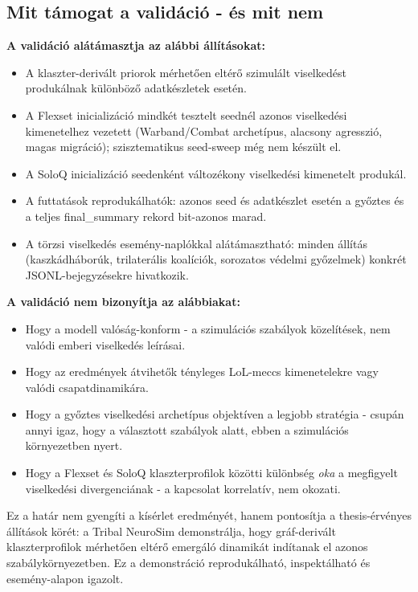 \subsection*{Mit támogat a validáció - és mit nem}

\textbf{A validáció alátámasztja az alábbi állításokat:}

\begin{itemize}
  \item A klaszter-derivált priorok mérhetően eltérő szimulált viselkedést produkálnak különböző adatkészletek esetén.
  \item A Flexset inicializáció mindkét tesztelt seednél azonos viselkedési kimenetelhez vezetett (Warband/Combat archetípus, alacsony agresszió, magas migráció); szisztematikus seed-sweep még nem készült el.
  \item A SoloQ inicializáció seedenként változékony viselkedési kimenetelt produkál.
  \item A futtatások reprodukálhatók: azonos seed és adatkészlet esetén a győztes és a teljes final\_summary rekord bit-azonos marad.
  \item A törzsi viselkedés esemény-naplókkal alátámasztható: minden állítás (kaszkádháborúk, trilaterális koalíciók, sorozatos védelmi győzelmek) konkrét JSONL-bejegyzésekre hivatkozik.
\end{itemize}

\textbf{A validáció nem bizonyítja az alábbiakat:}

\begin{itemize}
  \item Hogy a modell valóság-konform - a szimulációs szabályok közelítések, nem valódi emberi viselkedés leírásai.
  \item Hogy az eredmények átvihetők tényleges LoL-meccs kimenetelekre vagy valódi csapatdinamikára.
  \item Hogy a győztes viselkedési archetípus objektíven a legjobb stratégia - csupán annyi igaz, hogy a választott szabályok alatt, ebben a szimulációs környezetben nyert.
  \item Hogy a Flexset és SoloQ klaszterprofilok közötti különbség \textit{oka} a megfigyelt viselkedési divergenciának - a kapcsolat korrelatív, nem okozati.
\end{itemize}

Ez a határ nem gyengíti a kísérlet eredményét, hanem pontosítja a thesis-érvényes állítások körét: a Tribal NeuroSim demonstrálja, hogy gráf-derivált klaszterprofilok mérhetően eltérő emergáló dinamikát indítanak el azonos szabálykörnyezetben. Ez a demonstráció reprodukálható, inspektálható és esemény-alapon igazolt.

